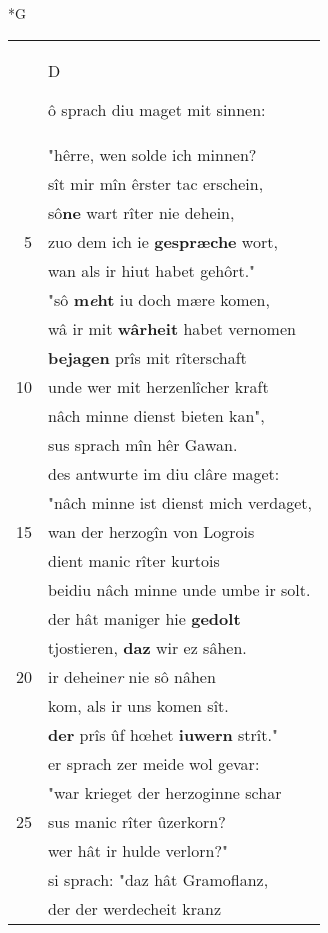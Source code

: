 \documentclass[8pt,a4paper,notitlepage]{article}
\begin{document}
\newpage
\begin{table}[ht]
\begin{minipage}[t]{0.5\linewidth}
\small
\begin{center}*G
\end{center}
\begin{tabular}{rl}
 & \begin{large}D\end{large}ô sprach diu maget mit sinnen:\\ 
 & "hêrre, wen solde ich minnen?\\ 
 & sît mir mîn êrster tac erschein,\\ 
 & sô\textbf{ne} wart rîter nie dehein,\\ 
5 & zuo dem ich ie \textbf{gespræche} wort,\\ 
 & wan als ir hiut habet gehôrt."\\ 
 & "sô \textbf{m\textit{e}ht} iu doch mære komen,\\ 
 & wâ ir mit \textbf{wârheit} habet vernomen\\ 
 & \textbf{bejagen} prîs mit rîterschaft\\ 
10 & unde wer mit herzenlîcher kraft\\ 
 & nâch minne dienst bieten kan",\\ 
 & sus sprach mîn hêr Gawan.\\ 
 & des antwurte im diu clâre maget:\\ 
 & "nâch minne ist dienst mich verdaget,\\ 
15 & wan der herzogîn von Logrois\\ 
 & dient manic rîter kurtois\\ 
 & beidiu nâch minne unde umbe ir solt.\\ 
 & der hât maniger hie \textbf{gedolt}\\ 
 & tjostieren, \textbf{daz} wir ez sâhen.\\ 
20 & ir deheine\textit{r} nie sô nâhen\\ 
 & kom, als ir uns komen sît.\\ 
 & \textbf{der} prîs ûf hœhet \textbf{iuwern} strît."\\ 
 & er sprach zer meide wol gevar:\\ 
 & "war krieget der herzoginne schar\\ 
25 & sus manic rîter ûzerkorn?\\ 
 & wer hât ir hulde verlorn?"\\ 
 & si sprach: "daz hât Gramoflanz,\\ 
 & der der werdecheit kranz\\ 

\end{tabular}
\end{minipage}
\end{table}
\end{document}
